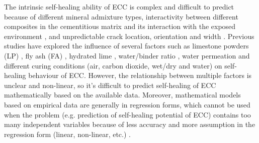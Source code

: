 \documentclass[11pt]{article}
\begin{document}
	The intrinsic self-healing ability of ECC is complex and difficult to predict because of different mineral admixture types, interactivity between different composites in the cementitious matrix and its interaction with the exposed environment \cite{wu2012review}, and unpredictable crack location, orientation and width \cite{huang2013characterization}. Previous studies have explored the influence of several factors such as limestone powders (LP) \cite{suleiman2019visualization,zhou2008developing}, fly ash (FA) \cite{li2007self,zhang2014investigating}, hydrated lime \cite{yildirim2014influence}, water/binder ratio \cite{yang2005self}, water permeation \cite{sahmaran2007transport} and different curing conditions (air, carbon dioxide, wet/dry and water) \cite{qian2010influence} on self-healing behaviour of ECC. However, the relationship between multiple factors is unclear and non-linear, so it’s difficult to predict self-healing of ECC mathematically based on the available data. Moreover, mathematical models based on empirical data are generally in regression forms, which cannot be used when the problem (e.g. prediction of self-healing potential of ECC) contains too many independent variables because of less accuracy and more assumption in the regression form (linear, non-linear, etc.) \cite{alshihri2009neural}.
	
	
\end{document}
